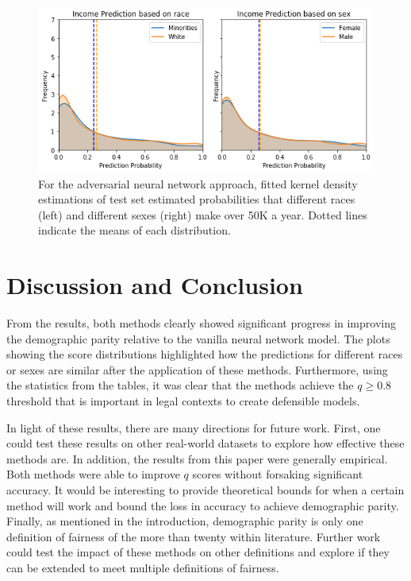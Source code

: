 \documentclass{article}
\begin{document}
\begin{figure}[ht]
	\vskip 0.2in
	\begin{center}
		\centerline{\includegraphics[width=\columnwidth]{img/adv_end.png}}
		\caption{For the adversarial neural network approach, fitted kernel density estimations of test set estimated probabilities that different races (left) and different sexes (right) make over 50K a year.  Dotted lines indicate the means of each distribution.}
		\label{adv-bias}
	\end{center}
	\vskip -0.1in
\end{figure}

\section{Discussion and Conclusion}
From the results, both methods clearly showed significant progress in improving the demographic parity relative to the vanilla neural network model. The plots showing the score distributions highlighted how the predictions for different races or sexes are similar after the application of these methods. Furthermore, using the statistics from the tables, it was clear that the methods achieve the $q \geq 0.8$ threshold that is important in legal contexts to create defensible models.

In light of these results, there are many directions for future work. First, one could test these results on other real-world datasets to explore how effective these methods are. In addition, the results from this paper were generally empirical. Both methods were able to improve $q$ scores without forsaking significant accuracy. It would be interesting to provide theoretical bounds for when a certain method will work and bound the loss in accuracy to achieve demographic parity. Finally, as mentioned in the introduction, demographic parity is only one definition of fairness of the more than twenty within literature. Further work could test the impact of these methods on other definitions and explore if they can be extended to meet multiple definitions of fairness.



\end{document}
